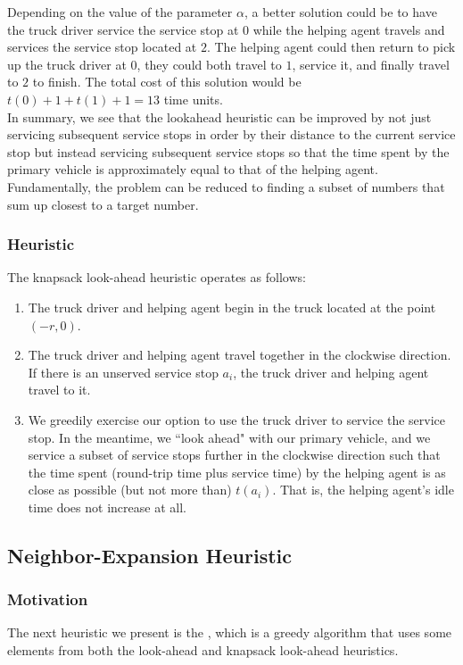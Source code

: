 \documentclass[12pt]{scrartcl}
\begin{document}
Depending on the value of the parameter $\alpha$, a better solution could be to have the truck driver service the service stop at $0$ while the helping agent travels and services the service stop located at $2$. The helping agent could then return to pick up the truck driver at $0$, they could both travel to $1$, service it, and finally travel to $2$ to finish. The total cost of this solution would be $t(0) + 1 + t(1) + 1 = 13$ time units. \\

In summary, we see that the lookahead heuristic can be improved by not just servicing subsequent service stops in order by their distance to the current service stop but instead servicing subsequent service stops so that the time spent by the primary vehicle is approximately equal to that of the helping agent. Fundamentally, the problem can be reduced to finding a subset of numbers that sum up closest to a target number. 

\subsubsection{Heuristic}
The knapsack look-ahead heuristic operates as follows:

\begin{enumerate}
    \item The truck driver and helping agent begin in the truck located at the point $(-r, 0)$.
    \item The truck driver and helping agent travel together in the clockwise direction. If there is an unserved service stop $a_i$, the truck driver and helping agent travel to it.
		\item We greedily exercise our option to use the truck driver to service the service stop. In the meantime, we ``look ahead" with our primary vehicle, and we service a subset of service stops further in the clockwise direction such that the time spent (round-trip time plus service time) by the helping agent is as close as possible (but not more than) $t(a_i)$. That is, the helping agent's idle time does not increase at all. 
\end{enumerate}

\iffalse
TODO: discuss benefits
\fi


\subsection{Neighbor-Expansion Heuristic}
\subsubsection{Motivation}
The next heuristic we present is the , which is a greedy algorithm that uses some elements from both the look-ahead and knapsack look-ahead heuristics. \\
\end{document}
